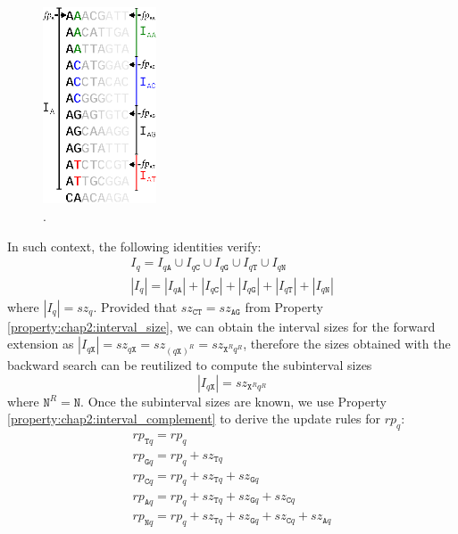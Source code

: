 \begin{figure}[h]
	\begin{minipage}[b]{\linewidth}
	  \centering
	  \includegraphics*[width=0.3\textwidth]{figures/chap2_forward_search}
	  \caption{.}
	  \label{fig:chap2:forward_search}
   \end{minipage}
\end{figure}
In such context, the following identities verify:
\begin{equation} 
  \begin{array}{c}
  I_q = I_{q\texttt{A}} \cup I_{q\texttt{C}} \cup I_{q\texttt{G}} \cup
  I_{q\texttt{T}} \cup I_{q\texttt{N}} \\
  |I_{q}| = |I_{q\texttt{A}}|+|I_{q\texttt{C}}|+|I_{q\texttt{G}}|+|I_{q\texttt{T}}|+|I_{q\texttt{N}}|
  \end{array}
\end{equation}
where $|I_q| = sz_{q}$. Provided that $sz_{\texttt{CT}} =
sz_{\texttt{AG}}$ from Property \ref{property:chap2:interval_size}, we
can obtain the interval sizes for the forward extension as
$|I_{q\texttt{X}}| = sz_{q\texttt{X}} = sz_{(q\texttt{X})^R} =
sz_{\texttt{X}^Rq^R}$, therefore the sizes obtained with the backward
search can be reutilized to compute the subinterval sizes
\begin{equation}
  \label{eq:chap2:interval_size}
  |I_{q\texttt{X}}| = sz_{\texttt{X}^Rq^R}
\end{equation}
where $\texttt{N}^R = \texttt{N}$. Once the subinterval sizes are
known, we use Property \ref{property:chap2:interval_complement} to
derive the update rules for $rp_{q}$: 
\begin{equation}
  \label{eq:chap2:forward_update}
  \begin{array}{c}
    rp_{\texttt{T}q} = rp_{q} \\
    rp_{\texttt{G}q} = rp_{q} + sz_{\texttt{T}q} \\
    rp_{\texttt{C}q} = rp_{q} + sz_{\texttt{T}q} + sz_{\texttt{G}q}\\
    rp_{\texttt{A}q} = rp_{q} + sz_{\texttt{T}q} + sz_{\texttt{G}q} +
    sz_{\texttt{C}q} \\
    rp_{\texttt{N}q} = rp_{q} + sz_{\texttt{T}q} + sz_{\texttt{G}q} +
    sz_{\texttt{C}q} + sz_{\texttt{A}q} \\
  \end{array}
\end{equation}

